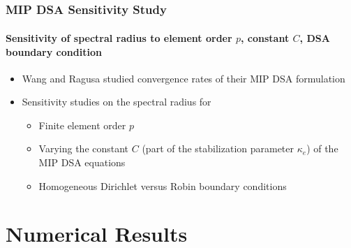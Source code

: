 \documentclass[compress,t]{beamer}
\begin{document}
\subsection{}

\begin{frame}
\frametitle{MIP DSA Sensitivity Study}
\framesubtitle{Sensitivity of spectral radius to element order $p$, constant $C$, DSA boundary condition}

\begin{itemize}
\item{Wang and Ragusa studied convergence rates of their MIP DSA formulation}
\item{Sensitivity studies on the spectral radius for}
\begin{itemize}
\item{Finite element order $p$}
\item{Varying the constant $C$ (part of the stabilization parameter $\kappa_e$) of the MIP DSA equations}
\item{Homogeneous Dirichlet versus Robin boundary conditions}
\end{itemize}
\end{itemize}

\end{frame}

\section{Numerical Results}
\subsection{}
\end{document}

